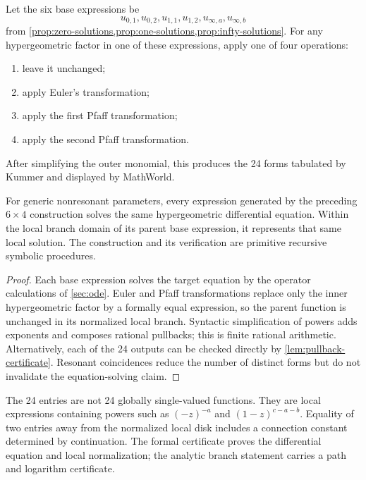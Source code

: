Let the six base expressions be
\[
 u_{0,1},u_{0,2},u_{1,1},u_{1,2},u_{\infty,a},u_{\infty,b}
\]
from \cref{prop:zero-solutions,prop:one-solutions,prop:infty-solutions}.
For any hypergeometric factor in one of these expressions, apply one of four
operations:
\begin{enumerate}[label=(\arabic*)]
\item leave it unchanged;
\item apply Euler's transformation;
\item apply the first Pfaff transformation;
\item apply the second Pfaff transformation.
\end{enumerate}
After simplifying the outer monomial, this produces the 24 forms tabulated by
Kummer and displayed by MathWorld.

\begin{theorem}\label{thm:kummer-24}
For generic nonresonant parameters, every expression generated by the
preceding \(6\times4\) construction solves the same hypergeometric differential
equation.  Within the local branch domain of its parent base expression, it
represents that same local solution.  The construction and its verification
are primitive recursive symbolic procedures.
\end{theorem}

\begin{proof}
Each base expression solves the target equation by the operator calculations
of \cref{sec:ode}.  Euler and Pfaff transformations replace only the inner
hypergeometric factor by a formally equal expression, so the parent function
is unchanged in its normalized local branch.  Syntactic simplification of
powers adds exponents and composes rational pullbacks; this is finite rational
arithmetic.  Alternatively, each of the 24 outputs can be checked directly
by \cref{lem:pullback-certificate}.  Resonant coincidences reduce the number
of distinct forms but do not invalidate the equation-solving claim.
\end{proof}

\begin{audit}
The 24 entries are not 24 globally single-valued functions.  They are local
expressions containing powers such as \((-z)^{-a}\) and
\((1-z)^{c-a-b}\).  Equality of two entries away from the normalized local
disk includes a connection constant determined by continuation.  The formal
certificate proves the differential equation and local normalization; the
analytic branch statement carries a path and logarithm certificate.
\end{audit}


